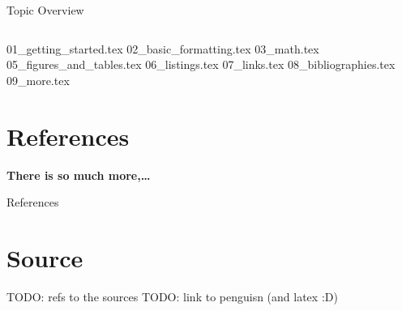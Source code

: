 



\begin{frame}{Topic Overview}
\begin{columns}[c,onlytextwidth]
\tableofcontents[sections={1-4}]
\tableofcontents[sections={5-8}]
\end{columns}
\end{frame}

{01_getting_started.tex}
{02_basic_formatting.tex}
{03_math.tex}
{05_figures_and_tables.tex}
{06_listings.tex}
{07_links.tex}
{08_bibliographies.tex}
{09_more.tex}

\appendix
\beginbackup

\section{References}

\begin{frame}[plain,c]{}
   \vspace*{4em}\centering\Large\bfseries There is so much more,\ldots
\end{frame}

\begin{frame}[allowframebreaks]{References}
\printbibliography
\end{frame}


\section{Source}
\begin{frame}
   TODO: refs to the sources
   TODO: link to penguisn (and latex :D)
\end{frame}
\backupend


